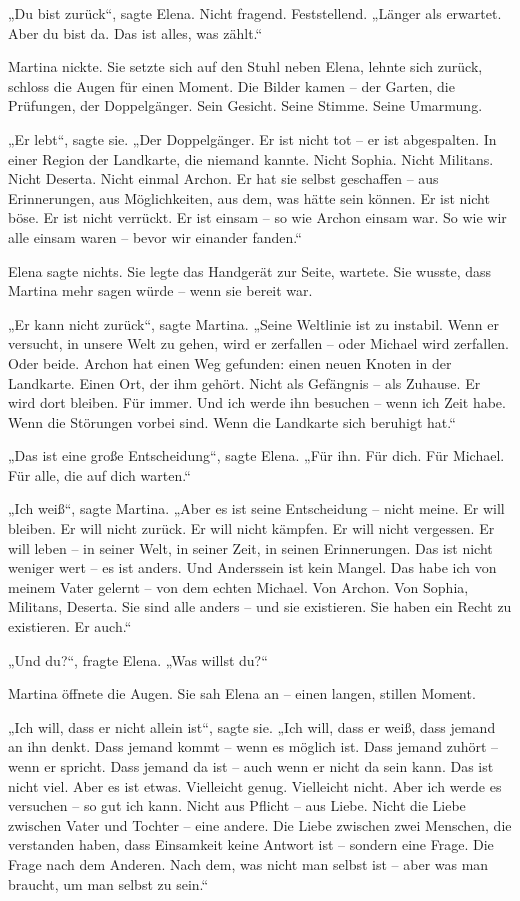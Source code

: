 \documentclass[
]{article}
\begin{document}
„Du bist zurück``, sagte Elena. Nicht fragend. Feststellend. „Länger als erwartet. Aber du bist da. Das ist alles, was zählt.``

Martina nickte. Sie setzte sich auf den Stuhl neben Elena, lehnte sich zurück, schloss die Augen für einen Moment. Die Bilder kamen -- der Garten, die Prüfungen, der Doppelgänger. Sein Gesicht. Seine Stimme. Seine Umarmung.

„Er lebt``, sagte sie. „Der Doppelgänger. Er ist nicht tot -- er ist abgespalten. In einer Region der Landkarte, die niemand kannte. Nicht Sophia. Nicht Militans. Nicht Deserta. Nicht einmal Archon. Er hat sie selbst geschaffen -- aus Erinnerungen, aus Möglichkeiten, aus dem, was hätte sein können. Er ist nicht böse. Er ist nicht verrückt. Er ist einsam -- so wie Archon einsam war. So wie wir alle einsam waren -- bevor wir einander fanden.``

Elena sagte nichts. Sie legte das Handgerät zur Seite, wartete. Sie wusste, dass Martina mehr sagen würde -- wenn sie bereit war.

„Er kann nicht zurück``, sagte Martina. „Seine Weltlinie ist zu instabil. Wenn er versucht, in unsere Welt zu gehen, wird er zerfallen -- oder Michael wird zerfallen. Oder beide. Archon hat einen Weg gefunden: einen neuen Knoten in der Landkarte. Einen Ort, der ihm gehört. Nicht als Gefängnis -- als Zuhause. Er wird dort bleiben. Für immer. Und ich werde ihn besuchen -- wenn ich Zeit habe. Wenn die Störungen vorbei sind. Wenn die Landkarte sich beruhigt hat.``

„Das ist eine große Entscheidung``, sagte Elena. „Für ihn. Für dich. Für Michael. Für alle, die auf dich warten.``

„Ich weiß``, sagte Martina. „Aber es ist seine Entscheidung -- nicht meine. Er will bleiben. Er will nicht zurück. Er will nicht kämpfen. Er will nicht vergessen. Er will leben -- in seiner Welt, in seiner Zeit, in seinen Erinnerungen. Das ist nicht weniger wert -- es ist anders. Und Anderssein ist kein Mangel. Das habe ich von meinem Vater gelernt -- von dem echten Michael. Von Archon. Von Sophia, Militans, Deserta. Sie sind alle anders -- und sie existieren. Sie haben ein Recht zu existieren. Er auch.``

„Und du?{\kern0pt}``, fragte Elena. „Was willst du?{\kern0pt}``

Martina öffnete die Augen. Sie sah Elena an -- einen langen, stillen Moment.

„Ich will, dass er nicht allein ist``, sagte sie. „Ich will, dass er weiß, dass jemand an ihn denkt. Dass jemand kommt -- wenn es möglich ist. Dass jemand zuhört -- wenn er spricht. Dass jemand da ist -- auch wenn er nicht da sein kann. Das ist nicht viel. Aber es ist etwas. Vielleicht genug. Vielleicht nicht. Aber ich werde es versuchen -- so gut ich kann. Nicht aus Pflicht -- aus Liebe. Nicht die Liebe zwischen Vater und Tochter -- eine andere. Die Liebe zwischen zwei Menschen, die verstanden haben, dass Einsamkeit keine Antwort ist -- sondern eine Frage. Die Frage nach dem Anderen. Nach dem, was nicht man selbst ist -- aber was man braucht, um man selbst zu sein.``
\end{document}

